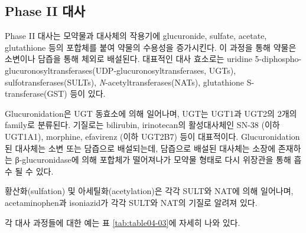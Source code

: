 \documentclass[
  11pt,
  krantz2, a4paper, twoside]{krantz}
\begin{document}
\subsection{Phase II 대사}\label{phase-ii-uxb300uxc0ac}

Phase II 대사는 모약물과 대사체의 작용기에 glucuronide, sulfate,
acetate, glutathione 등의 포합체를 붙여 약물의 수용성을 증가시킨다. 이
과정을 통해 약물은 소변이나 담즙을 통해 체외로 배설된다. 대표적인 대사
효소로는 uridine 5\textquotesingle-diphospho-glucuronosyltransferases(UDP-glucuronosyltransferases, UGTs), sulfotransferases(SULTs),
\emph{N}-acetyltransferases(NATs), glutathione S-transferase(GST) 등이
있다.

Glucuronidation은 UGT 동효소에 의해 일어나며, UGT는 UGT1과
UGT2의 2개의 family로 분류된다. 기질로는 bilirubin, irinotecan의
활성대사체인 SN-38 (이하 UGT1A1), morphine, efavirenz (이하 UGT2B7) 등이
대표적이다. Glucuronidation된 대사체는 소변 또는 담즙으로 배설되는데,
담즙으로 배설된 대사체는 소장에 존재하는 β-glucuronidase에 의해 포합체가
떨어져나가 모약물 형태로 다시 위장관을 통해 흡수 될 수 있다.

황산화(sulfation) 및 아세틸화(acetylation)은 각각 SULT와 NAT에 의해
일어나며, acetaminophen과 isoniazid가 각각 SULT와 NAT의 기질로 알려져
있다.

각 대사 과정들에 대한 예는 표 \ref{tab:table04-03}에 자세히 나와 있다.
\end{document}
